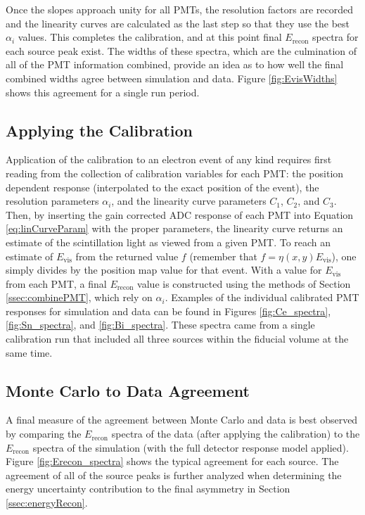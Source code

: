 Once the slopes approach unity for all PMTs, the resolution factors are recorded and the linearity curves
are calculated as the last step so that they use the best $\alpha_i$ values. This completes the calibration,
and at this point final $E_{\mathrm{recon}}$ spectra for each source peak exist. The widths of these
spectra, which are the culmination of all of the PMT information combined, provide an idea as to how well the
final combined widths agree between simulation and data. Figure \ref{fig:EvisWidths} shows this
agreement for a single run period.


\subsection{Applying the Calibration} \label{ssec:appCal}

Application of the calibration to an electron event of any kind requires first reading from the collection
of calibration variables for each PMT: the position dependent response (interpolated to the exact position of the event),
the resolution parameters $\alpha_i$, and the linearity curve parameters $C_1$, $C_2$, and $C_3$.
Then, by inserting the gain corrected ADC
response of each PMT into Equation \ref{eq:linCurveParam} with the proper parameters, the linearity curve returns
an estimate of the scintillation light as viewed from a given PMT. To reach an estimate of $E_{\mathrm{vis}}$
from the returned value $f$ (remember that $f = \eta(x,y)E_{\mathrm{vis}}$), one simply divides by the
position map value for that event. With a value for $E_{\mathrm{vis}}$ from each PMT, a final
$E_{\mathrm{recon}}$ value is constructed using the methods of Section \ref{ssec:combinePMT}, which rely on $\alpha_i$.
Examples of the individual calibrated PMT responses for simulation and data
can be found in Figures \ref{fig:Ce_spectra}, \ref{fig:Sn_spectra}, and \ref{fig:Bi_spectra}.
These spectra came from a single calibration run that included all three sources within the fiducial volume at the same time.

\subsection{Monte Carlo to Data Agreement}
A final measure of the agreement between Monte Carlo and data is best observed by comparing the $E_{\mathrm{recon}}$
spectra of the data (after applying the calibration) to the $E_{\mathrm{recon}}$ spectra of the simulation (with
the full detector response model applied). Figure \ref{fig:Erecon_spectra} shows the typical agreement for each source.
The agreement of all of the source peaks is further analyzed when determining the energy uncertainty contribution
to the final asymmetry in Section \ref{ssec:energyRecon}.


